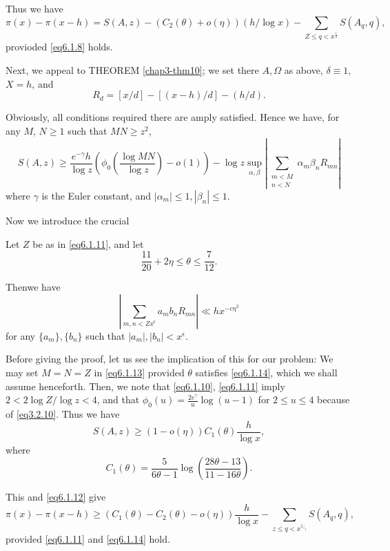  Thus we have
 \begin{equation*}
 \pi (x) - \pi (x-h) = S(A, z) - (C_2( \theta ) +o(\eta )) (h/ \log
 x) - \sum_{ Z \leq q < x^{\frac{1}{2}}} S(A_q, q), \tag{6.1.12}\label{eq6.1.12} 
 \end{equation*} 
 provioded \eqref{eq6.1.8} holds.
 
 Next, we appeal to THEOREM \ref{chap3-thm10}; we set there $A,
 \Omega$ as above, $\delta \equiv 1$, $X = h$, and 
 $$
 R_d = [ x / d] - [(x - h)/d]-(h/d).
 $$

Obviously, all conditions required there are amply satisfied. Hence we
have, for any $M$, $N \geq 1$ such that $MN \geq z^2$, 
\begin{equation*}
  S(A, z) \geq \frac{e^{-\gamma }h}{\log z} \left( \phi _0 \left(\frac{\log
    MN}{\log z}\right) - o(1)\right) 
- \log z \sup _{\alpha,  \beta}| \sum_{\substack{m < M  \\ n <
    N}}\alpha _m \beta _n R_{mn}| \tag{6.1.13} \label{eq6.1.13}
\end{equation*}
where $\gamma$ is the Euler constant, and $| \alpha _ m | \leq 1, |
\beta _n | \leq 1$.  

Now we introduce the crucial
\begin{Lemma}\label{chap6-lem27}%
Let $Z$ be as in \eqref{eq6.1.11}, and let
  \begin{equation*}
    \frac{11}{20} + 2 \eta \leq \theta \leq
    \frac{7}{12}. \tag{6.1.14}\label{eq6.1.14} 
  \end{equation*}

  Then\pageoriginale we have
  $$
  | \sum_{m, n < Z x^\epsilon } a_m b_n R_{mn} | \ll hx^{-c \eta ^{3}}
  $$
  for any $\{ a_m\}, \{ b_n\}$ such that $ | a_m |, | b_n | < x^{\epsilon }$.
\end{Lemma}

Before giving the proof, let us see  the implication of this for our
problem: We may set $M = N = Z $ in \eqref{eq6.1.13} provided $\theta$
satisfies \eqref{eq6.1.14}, which we shall assume henceforth. Then, we note
that \eqref{eq6.1.10}, \eqref{eq6.1.11} imply $2 < 2 \log Z/ \log z <
4$, and that 
$\phi _0 (u) = \frac{ 2 e ^ \gamma}{u} \log (u-1)$ for $2 \leq u \leq
4 $ because of \eqref{eq3.2.10}. Thus we have 
$$
S(A, z)\geq (1 - o(\eta )) C_1 ( \theta) \frac{h}{\log x},
$$
where
$$
C_1 (\theta) = \frac{5}{ 6 \theta-1} \log \left(\frac{28 \theta - 13}{11 -
  16 \theta}\right).
$$

This and \eqref{eq6.1.12} give 
\begin{equation*}
\pi (x) - \pi (x-h) \geq (C_1 ( \theta ) - C_2 ( \theta ) - o(\eta))
\frac{h}{\log x}- \sum_{z \leq q < x^{1_{/_{2}}}} S(A_q, q),
\tag{6.1.15} \label{eq6.1.15}
\end{equation*}
provided \eqref{eq6.1.11} and \eqref{eq6.1.14} hold.

